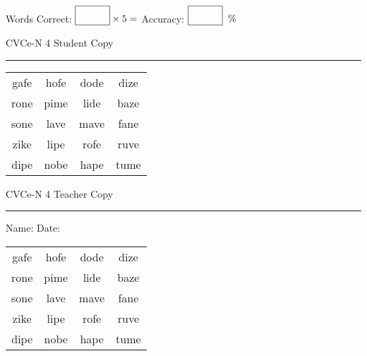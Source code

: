 \documentclass{memoir}
\begin{document}
\small

Words Correct: $\fbox{\phantom{\huge 100}} \times 5 = $ Accuracy: $\fbox{\phantom{\huge 100}}\;\; \%$ 

\vfill

\newpage


\footnotesize \noindent
CVCe-N 4 \hfill Student Copy
\smallskip
\hrule

\Large

\setlength{\tabcolsep}{14pt}
\def\arraystretch{2}

{\selectfont


\begin{vplace}[0.5]
\begin{center}
\begin{tabular}{cccc}
gafe & hofe & dode & dize \\
rone & pime & lide & baze \\
sone & lave & mave & fane \\
zike & lipe & rofe & ruve \\
dipe & nobe & hape & tume \\
\end{tabular}
\end{center}
\end{vplace}

}

\newpage

\footnotesize \noindent
CVCe-N 4 \hfill Teacher Copy
\smallskip
\hrule

\small

\vfill

\noindent
Name: \underline{\hspace{1.75in}} \hfill Date: \underline{\hspace{1in}}

\Large

{\selectfont


\begin{vplace}[0.5]
\begin{center}
\begin{tabular}{cccc}
gafe & hofe & dode & dize \\
rone & pime & lide & baze \\
sone & lave & mave & fane \\
zike & lipe & rofe & ruve \\
dipe & nobe & hape & tume \\
\end{tabular}
\end{center}
\end{vplace}



}
\end{document}
